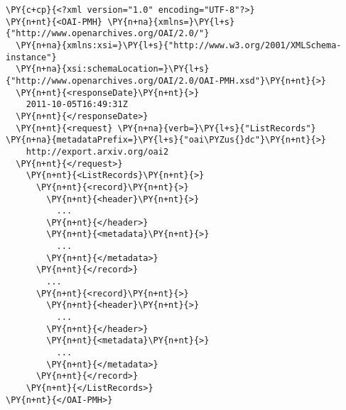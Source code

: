 \begin{Verbatim}[commandchars=\\\{\}, fontsize=\footnotesize, frame=single]
\PY{c+cp}{<?xml version="1.0" encoding="UTF-8"?>}
\PY{n+nt}{<OAI-PMH} \PY{n+na}{xmlns=}\PY{l+s}{"http://www.openarchives.org/OAI/2.0/"}
  \PY{n+na}{xmlns:xsi=}\PY{l+s}{"http://www.w3.org/2001/XMLSchema-instance"} 
  \PY{n+na}{xsi:schemaLocation=}\PY{l+s}{"http://www.openarchives.org/OAI/2.0/OAI-PMH.xsd"}\PY{n+nt}{>}
  \PY{n+nt}{<responseDate}\PY{n+nt}{>}
    2011-10-05T16:49:31Z
  \PY{n+nt}{</responseDate>}
  \PY{n+nt}{<request} \PY{n+na}{verb=}\PY{l+s}{"ListRecords"} \PY{n+na}{metadataPrefix=}\PY{l+s}{"oai\PYZus{}dc"}\PY{n+nt}{>}
    http://export.arxiv.org/oai2
  \PY{n+nt}{</request>}
    \PY{n+nt}{<ListRecords}\PY{n+nt}{>}
      \PY{n+nt}{<record}\PY{n+nt}{>}
        \PY{n+nt}{<header}\PY{n+nt}{>}
          ...
        \PY{n+nt}{</header>}
        \PY{n+nt}{<metadata}\PY{n+nt}{>}
          ...
        \PY{n+nt}{</metadata>}
      \PY{n+nt}{</record>}
        ...
      \PY{n+nt}{<record}\PY{n+nt}{>}
        \PY{n+nt}{<header}\PY{n+nt}{>}
          ...
        \PY{n+nt}{</header>}
        \PY{n+nt}{<metadata}\PY{n+nt}{>}
          ...
        \PY{n+nt}{</metadata>}
      \PY{n+nt}{</record>}
    \PY{n+nt}{</ListRecords>}
\PY{n+nt}{</OAI-PMH>}
\end{Verbatim}
